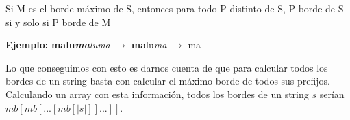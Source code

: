 \begin{corolario}
    Si M es el borde máximo de S, entonces para todo P distinto de S, P borde de S si y solo si P borde de M
\end{corolario}

\textbf{Ejemplo:} \textbf{malu\textit{ma}}\textit{luma} $\to$ \textbf{ma}lu\textit{ma} $\to$ ma

Lo que conseguimos con esto es darnos cuenta de que para calcular todos los bordes de un string basta con calcular el máximo borde de todos sus prefijos. Calculando un array con esta información, todos los bordes de un string $s$ serían $mb[mb[...[mb[|s|]]...]]$.

